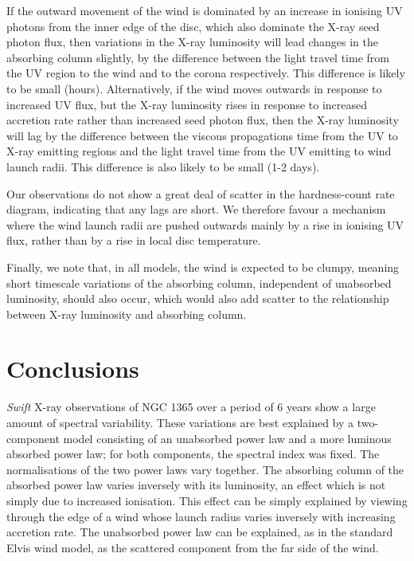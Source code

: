 \documentclass[useAMS,usenatbib]{sam}
\begin{document}


If the outward movement of the wind is dominated by an increase in ionising UV photons from the inner edge of the disc, which also dominate the X-ray seed photon flux,
then variations in the X-ray luminosity will lead changes in the absorbing column slightly, by the difference between the light travel time from the UV region to the wind
and to the corona respectively. This difference is likely to be small (hours). Alternatively, if the wind moves outwards in response to increased UV flux, but the X-ray
luminosity rises in response to increased accretion rate rather than increased seed photon flux, then the X-ray luminosity will lag by the difference between the viscous
propagations time from the UV to X-ray emitting regions and the light travel time from the UV emitting to wind launch radii. This difference is also likely to be small
(1-2 days).

Our observations do not show a great deal of scatter in the hardness-count rate diagram, indicating that any lags are short. We therefore favour a mechanism where the
wind launch radii are pushed outwards mainly by a rise in ionising UV flux, rather than by a rise in local disc temperature. 

Finally, we note that, in all models, the wind is expected to be clumpy, meaning short timescale variations of the absorbing column, independent of unabsorbed luminosity,
should also occur, which would also add scatter to the relationship between X-ray luminosity and absorbing column.


\section{Conclusions}

{\it Swift} X-ray observations of NGC 1365 over a period of 6 years show a large amount of spectral variability. These variations are best explained by a two-component
model
consisting of an unabsorbed power law and a more luminous absorbed power law; for both components, the spectral index was fixed. The normalisations of the two power laws
vary together. The absorbing column of the absorbed power law varies inversely with its luminosity, an effect which is not simply due to increased ionisation. This effect
can be simply explained by viewing through the edge of a wind whose launch radius varies inversely with increasing accretion rate. The unabsorbed power law can be
explained, as in the standard Elvis wind model, as the scattered component from the far side of the wind.
\end{document}
